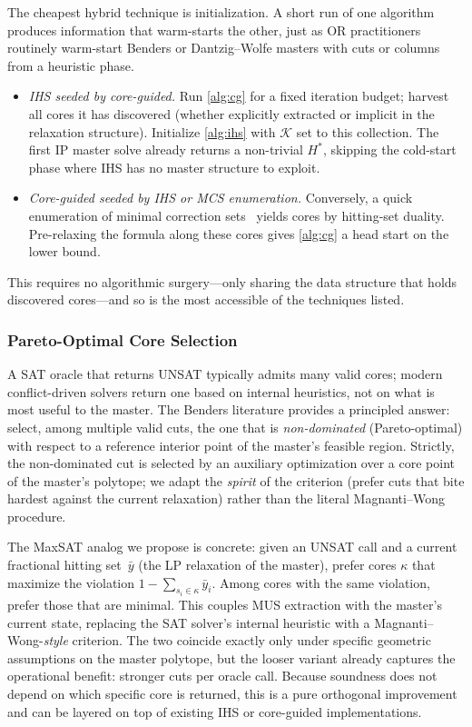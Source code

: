 The cheapest hybrid technique is initialization. A short run of one algorithm
produces information that warm-starts the other, just as OR practitioners
routinely warm-start Benders or Dantzig--Wolfe masters with cuts or columns
from a heuristic phase.

\begin{itemize}
\item \emph{IHS seeded by core-guided.} Run \cref{alg:cg} for a fixed
iteration budget; harvest all cores it has discovered (whether explicitly
extracted or implicit in the relaxation structure). Initialize
\cref{alg:ihs} with $\mathcal{K}$ set to this collection. The first
IP master solve already returns a non-trivial $H^*$, skipping the cold-start
phase where IHS has no master structure to exploit.
\item \emph{Core-guided seeded by IHS or MCS enumeration.} Conversely, a quick
enumeration of minimal correction sets~\citep{liffiton2008algorithms} yields
cores by hitting-set duality. Pre-relaxing the formula along these cores gives
\cref{alg:cg} a head start on the lower bound.
\end{itemize}

This requires no algorithmic surgery---only sharing the data structure that
holds discovered cores---and so is the most accessible of the techniques
listed.

\subsubsection{Pareto-Optimal Core Selection}

A SAT oracle that returns UNSAT typically admits many valid cores; modern
conflict-driven solvers return one based on internal heuristics, not on what
is most useful to the master. The Benders literature provides a principled
answer: \citet{magnanti1981accelerating} select, among multiple valid cuts,
the one that is \emph{non-dominated} (Pareto-optimal) with respect to a
reference interior point of the master's feasible region. Strictly, the
non-dominated cut is selected by an auxiliary optimization over a core point
of the master's polytope; we adapt the \emph{spirit} of the criterion (prefer
cuts that bite hardest against the current relaxation) rather than the literal
Magnanti--Wong procedure.

The MaxSAT analog we propose is concrete: given an UNSAT call and a current
fractional hitting set~$\bar{y}$ (the LP relaxation of the master), prefer
cores $\kappa$ that maximize the violation
$1 - \sum_{s_i \in \kappa} \bar{y}_i$. Among cores with the same violation,
prefer those that are minimal. This couples MUS extraction with the master's
current state, replacing the SAT solver's internal heuristic with a
Magnanti--Wong-\emph{style} criterion. The two coincide exactly only under
specific geometric assumptions on the master polytope, but the looser variant
already captures the operational benefit: stronger cuts per oracle call.
Because soundness does not depend on which specific core is returned, this is
a pure orthogonal improvement and can be layered on top of existing IHS or
core-guided implementations.

